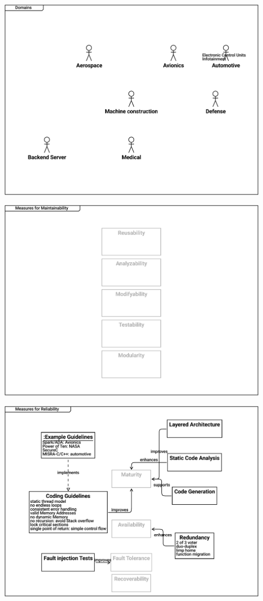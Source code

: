 \documentclass{article}
\begin{document}
\includegraphics[width= 1.0\linewidth]{quality_export/5_Domains.pdf}


\includegraphics[width= 1.0\linewidth]{quality_export/7_Measures_for_Maintainability.pdf}


\includegraphics[width= 1.0\linewidth]{quality_export/8_Measures_for_Reliability.pdf}

\end{document}

